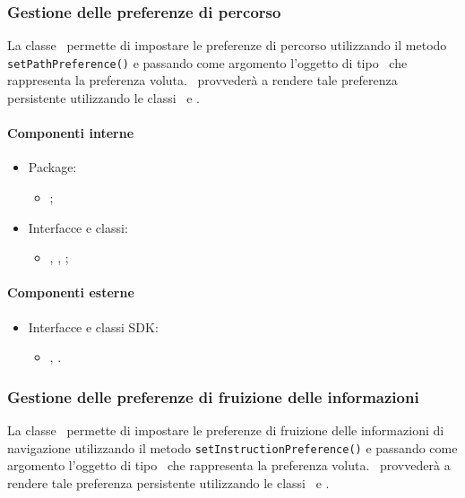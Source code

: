 \documentclass[../Funzionalita.tex]{subfiles}
\begin{document}
		
		\subsubsection{Gestione delle preferenze di percorso}
			La classe \SettingImp\ permette di impostare le preferenze di percorso utilizzando il metodo \lstinline|setPathPreference()| e passando come argomento l'oggetto di tipo \PathPreference\ che rappresenta la preferenza voluta. \SettingImp\ provvederà a rendere tale preferenza persistente utilizzando le classi \SharedPreferences\ e \SharedPreferenceEditor.

			\paragraph*{Componenti interne}
			\begin{itemize}
			
				\item Package:
				\begin{itemize}
					\item[] \usersetting;
				\end{itemize}
				
				\item Interfacce e classi:
				\begin{itemize}
					\item[] \Setting, \SettingImp, \PathPreference;
				\end{itemize}
				
			\end{itemize}
			
			
			\paragraph*{Componenti esterne}
			
			\begin{itemize}
				\item Interfacce e classi SDK:
				\begin{itemize}
					\item[] \SharedPreferences, \SharedPreferenceEditor.
				\end{itemize}
			\end{itemize}
		
		
		\subsubsection{Gestione delle preferenze di fruizione delle informazioni}
			La classe \SettingImp\ permette di impostare le preferenze di fruizione delle informazioni di navigazione utilizzando il metodo \lstinline|setInstructionPreference()| e passando come argomento l'oggetto di tipo \InstructionPreference\ che rappresenta la preferenza voluta. \SettingImp\ provvederà a rendere tale preferenza persistente utilizzando le classi \SharedPreferences\ e \SharedPreferenceEditor.
		
\end{document}
